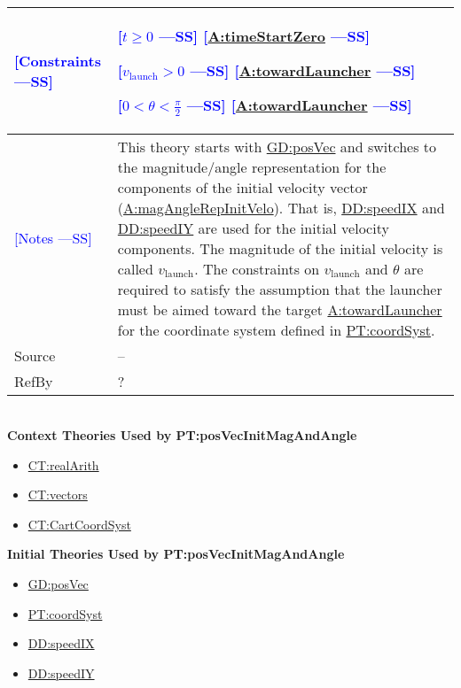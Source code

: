 \documentclass[12pt]{article}
\newcommand{\authornote}[3]{\textcolor{#1}{[#3 ---#2]}}
\newcommand{\authornote}[3]{}
\newcommand{\wss}[1]{\authornote{blue}{SS}{#1}}
\begin{document}
\begin{minipage}{\textwidth}
\begin{tabular}{>{\raggedright}p{}>{\raggedright\arraybackslash}p{}}
\\ \midrule
\wss{Constraints} & 
\begin{symbDescription}
\item \wss{$t \geq 0$} \wss{\hyperref[timeStartZero]{A:timeStartZero}}
\item \wss{$v_\text{launch} > 0$} \wss{\hyperref[towardLauncher]{A:towardLauncher}}
\item \wss{$
0 < \theta < \frac{\pi}{2}$} \wss{\hyperref[towardLauncher]{A:towardLauncher}}
\end{symbDescription}

\\ \midrule \wss{Notes} & This theory starts with
\hyperref[GD:posVec]{GD:posVec} and switches to the magnitude/angle
representation for the components of the initial velocity vector
(\hyperref[magAngleRepInitVelo]{A:magAngleRepInitVelo}).  That is,
\hyperref[DD:speedIX]{DD:speedIX} and \hyperref[DD:speedIY]{DD:speedIY} are used
for the initial velocity components. The magnitude of the initial velocity is
called $v_\text{launch}$.  The constraints on $v_\text{launch}$ and $\theta$ are
required to satisfy the assumption that the launcher must be aimed toward the
target \hyperref[towardLauncher]{A:towardLauncher} for the coordinate system
defined in \hyperref[PT:coordSyst]{PT:coordSyst}.

\\ \midrule
Source & --
         
\\ \midrule
RefBy & ?

\\ \bottomrule
\end{tabular}
\end{minipage}
~\\

\noindent \textbf{Context Theories Used by PT:posVecInitMagAndAngle}

\begin{itemize}
\item \hyperref[CT:realArith]{CT:realArith}
\item \hyperref[CT:vectors]{CT:vectors}
\item \hyperref[CT:CartCoordSyst]{CT:CartCoordSyst}
\end{itemize}

\noindent \textbf{Initial Theories Used by PT:posVecInitMagAndAngle}

\begin{itemize}
\item \hyperref[GD:posVec]{GD:posVec}
\item \hyperref[PT:coordSyst]{PT:coordSyst}
\item \hyperref[DD:speedIX]{DD:speedIX}
\item \hyperref[DD:speedIY]{DD:speedIY}
\end{itemize}
\end{document}
